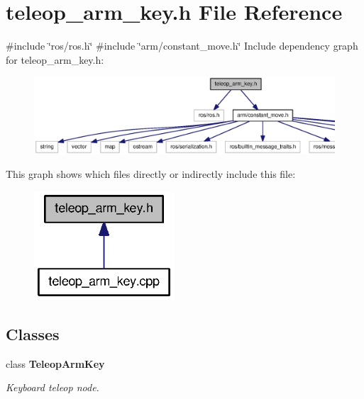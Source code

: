 \section{teleop\-\_\-arm\-\_\-key.\-h \-File \-Reference}
\label{teleop__arm__key_8h}
{\ttfamily \#include \char`\"{}ros/ros.\-h\char`\"{}}\*
{\ttfamily \#include \char`\"{}arm/constant\-\_\-move.\-h\char`\"{}}\*
\-Include dependency graph for teleop\-\_\-arm\-\_\-key.\-h\-:\nopagebreak
\begin{figure}[H]
\begin{center}
\leavevmode
\includegraphics[width=350pt]{teleop__arm__key_8h__incl}
\end{center}
\end{figure}
\-This graph shows which files directly or indirectly include this file\-:\nopagebreak
\begin{figure}[H]
\begin{center}
\leavevmode
\includegraphics[width=148pt]{teleop__arm__key_8h__dep__incl}
\end{center}
\end{figure}
\subsection*{\-Classes}
\begin{DoxyCompactItemize}
\item 
class {\bf \-Teleop\-Arm\-Key}
\begin{DoxyCompactList}\small\item\em \-Keyboard teleop node. \end{DoxyCompactList}\end{DoxyCompactItemize}

